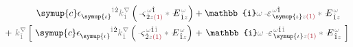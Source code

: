 \begin{subequations}
	\abovedisplayskip=4pt
	\belowdisplayskip=6pt
\begin{align}
	{\symup{c}} \epsilon^{\hphantom{\symup{\iota}}\mathcolor{gray}{\dot{1}}\dot{2}}_{\symup{\iota}} \mathcolor{gray}{k^\nabla_{\dot{1}}} \left( \Xint{\begin{smallmatrix} ~ \\ {}^{}_{\mathcolor{gray}{-}} \\ ~ \end{smallmatrix}}{13}{\varsigma}^{\;\! \mathcolor{gray}{\omega} \hat{1}}_{\;\! \dot{2} \mathcolor{gray}{z} \textcolor{Maroon}{(1)}} \mathcolor{gray}{*} \Xint{\mathcolor{gray}{-}}{295}{E}^{\;\!\mathcolor{gray}{\omega}}_{\;\! \hat{1} \mathcolor{gray}{z}} \right) &+ \mathbb{i} \mathcolor{gray}{\omega} \Xint{\begin{smallmatrix} ~ \\ {}^{}_{\mathcolor{gray}{-}} \\ ~ \end{smallmatrix}}{16}{\varepsilon}^{\;\! \mathcolor{gray}{\omega} \hat{1}}_{\;\! \symup{\iota} \mathcolor{gray}{z} \textcolor{Maroon}{(1)}} \mathcolor{gray}{*} \Xint{\mathcolor{gray}{-}}{295}{E}^{\;\!\mathcolor{gray}{\omega}}_{\;\! \hat{1} \mathcolor{gray}{z}}  \label{eq:nonlinear(2)-wave_wkrho} \\ 
	+~ \mathcolor{gray}{k^\nabla_{\check{1}}} \left[~ {\symup{c}} \epsilon^{\hphantom{\symup{\iota}}\mathcolor{gray}{\dot{1}}\dot{2}}_{\symup{\iota}} \mathcolor{gray}{k^\nabla_{\dot{1}}} \left( \Xint{\begin{smallmatrix} ~ \\ {}^{}_{\mathcolor{gray}{-}} \\ ~ \end{smallmatrix}}{13}{\varsigma}^{\;\! \mathcolor{gray}{\omega} \hat{1} \mathcolor{gray}{\check{1}}}_{\;\! \dot{2} \mathcolor{gray}{z} \textcolor{Maroon}{(1)}} \mathcolor{gray}{*} \Xint{\mathcolor{gray}{-}}{295}{E}^{\;\!\mathcolor{gray}{\omega}}_{\;\! \hat{1} \mathcolor{gray}{z}} \right) \right.&+ \left.\mathbb{i} \mathcolor{gray}{\omega} \Xint{\begin{smallmatrix} ~ \\ {}^{}_{\mathcolor{gray}{-}} \\ ~ \end{smallmatrix}}{16}{\varepsilon}^{\;\! \mathcolor{gray}{\omega} \hat{1} \mathcolor{gray}{\check{1}}}_{\;\! \symup{\iota} \mathcolor{gray}{z} \textcolor{Maroon}{(1)}} \mathcolor{gray}{*} \Xint{\mathcolor{gray}{-}}{295}{E}^{\;\!\mathcolor{gray}{\omega}}_{\;\! \hat{1} \mathcolor{gray}{z}} ~\right] \\ 

\end{align}
\end{subequations}
